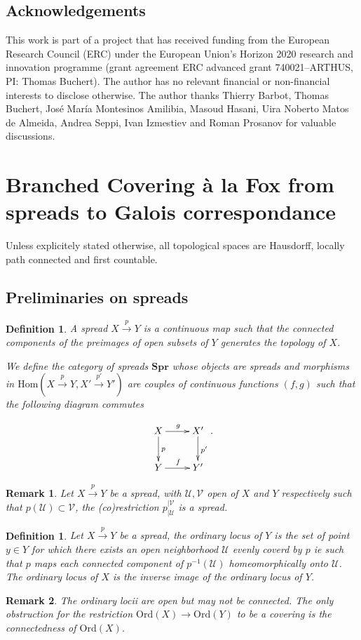 \documentclass[a4paper,12pt]{article}
\newtheorem{defi}[lem]{Definition}    %
\newtheorem{rem}{Remark}             %
\def\U{\mathcal U}
\def\V{\mathcal V}
\def\V{\mathcal V}
\def\U{\mathcal{U}}
\def\ord{\mathrm{Ord}}
\def\CatSpread{\mathbf{Spr}}
\begin{document}
\subsection*{Acknowledgements}
This work is part of a project that has received funding from the European Research Council (ERC) under the European Union's Horizon 2020 research and innovation programme (grant agreement ERC advanced grant 740021--ARTHUS, PI: Thomas Buchert). The author has no relevant financial or non-financial interests to disclose otherwise.
The author thanks Thierry Barbot, Thomas Buchert, José María Montesinos Amilibia,   Masoud Hasani,  Uira Noberto Matos de Almeida, Andrea Seppi,  Ivan Izmestiev and Roman Prosanov for valuable discussions.


\section{Branched Covering à la  Fox from spreads to Galois correspondance}
Unless explicitely stated otherwise, all topological spaces are Hausdorff, locally path connected and first countable.
\subsection{Preliminaries on spreads}

\begin{defi}\label{def:spread_continuous_map_connected} A spread $X\xrightarrow{p} Y$ is a continuous map such that the connected components of the preimages of open subsets of $Y$ generates the topology of $X$.

We define the category of spreads $\CatSpread$ whose objects are spreads and morphisms in $\mathrm{Hom}(X\xrightarrow{p} Y, X'\xrightarrow{p'} Y')$ are couples of continuous functions $(f,g)$  such that the following diagram commutes

$$\xymatrix{
X\ar[d]^p \ar[r]^g & X' \ar[d]^{p'} \\ Y \ar[r]^{f} & Y'
}.$$

\end{defi}

\begin{rem}\label{rem:spread_open_respectively_co} Let $X\xrightarrow{p} Y$ be a spread, 
with $\U,\V$ open of $X$  and $Y$ respectively such that $p(\U)\subset \V$, the (co)restriction $p_{|\U}^{|\V}$ is a spread.
\end{rem}
\begin{defi}\label{def:spread_ordinary_locus_set}
 Let $X\xrightarrow{p} Y$ be a spread, the {\it ordinary locus} of $Y$  is the set of point $y\in Y$  for which there exists an open neighborhood $\U$ evenly coverd by $p$ ie such that $p$ maps each connected component of $p^{-1}(\U)$ homeomorphically onto $\U$. The ordinary locus of $X$ is the inverse image of the ordinary locus of $Y$.
\end{defi}
\begin{rem}\label{rem:ordinary_locii_open_but}
 The ordinary locii are open but may not be connected. The only obstruction for the restriction $\ord(X)\rightarrow \ord(Y)$ to be a covering is the connectedness of $\ord(X)$.
\end{rem}
\end{document}
